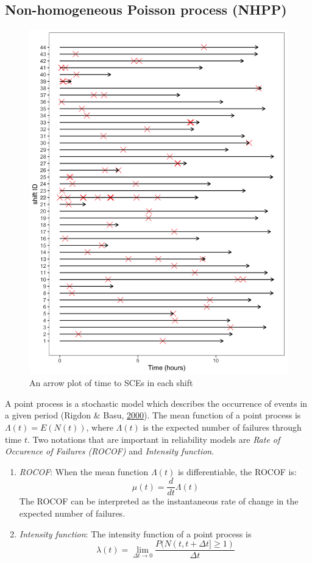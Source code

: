 \documentclass[12pt]{book}
\numberwithin{equation}{chapter}
\begin{document}
\hypertarget{non-homogeneous-poisson-process-nhpp}{%
\subsection{Non-homogeneous Poisson process (NHPP)}\label{non-homogeneous-poisson-process-nhpp}}

\begin{figure}[h]

{\centering \includegraphics[width=0.5\linewidth]{figs/NHPP_arrow_plot} 

}

\caption{An arrow plot of time to SCEs in each shift}\label{fig:arrowplot}
\end{figure}

A point process is a stochastic model which describes the occurrence of events in a given period (Rigdon \& Basu, \protect\hyperlink{ref-rigdon2000statistical}{2000}). The mean function of a point process is \(\Lambda(t) = E(N(t))\), where \(\Lambda(t)\) is the expected number of failures through time \(t\). Two notations that are important in reliability models are \emph{Rate of Occurence of Failures (ROCOF)} and \emph{Intensity function}.

\begin{enumerate}
\def\labelenumi{\arabic{enumi}.}
\item
  \emph{ROCOF}: When the mean function \(\Lambda(t)\) is differentiable, the ROCOF is:
  \[\mu(t) = \frac{d}{dt}\Lambda(t)\]
  The ROCOF can be interpreted as the instantaneous rate of change in the expected number of failures.
\item
  \emph{Intensity function}: The intensity function of a point process is
  \[\lambda(t) = \lim_{\Delta t \rightarrow 0}\frac{P(N(t, t+\Delta t] \geq 1)}{\Delta t}\]
\end{enumerate}
\end{document}
